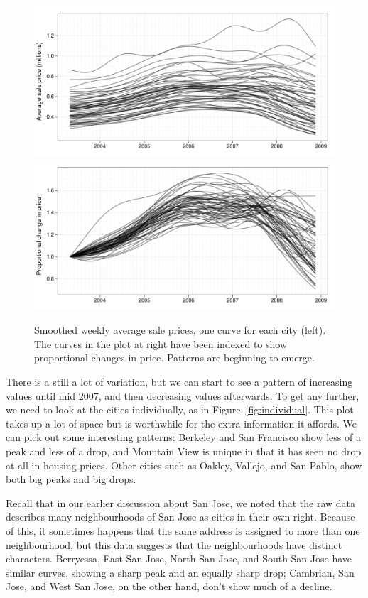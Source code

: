 \documentclass[oneside]{article}
\begin{document}
\begin{figure}[htbp]
  \centering
  \includegraphics[width=0.5 \linewidth]{cities-smooth}%
  \includegraphics[width=0.5 \linewidth]{cities-indexed}
  \caption{Smoothed weekly average sale prices, one curve for each city (left).  The curves in the plot at right have been indexed to show proportional changes in price.  Patterns are beginning to emerge.}
  \label{fig:smoothed}
\end{figure}

There is a still a lot of variation, but we can start to see a pattern of increasing values until mid 2007, and then decreasing values afterwards.  To get any further, we need to look at the cities individually, as in Figure~\ref{fig:individual}.  This plot takes up a lot of space but is worthwhile for the extra information it affords.  We can pick out some interesting patterns: Berkeley and San Francisco show less of a peak and less of a drop, and Mountain View is unique in that it has seen no drop at all in housing prices.  Other cities such as Oakley, Vallejo, and San Pablo, show both big peaks and big drops.

Recall that in our earlier discussion about San Jose, we noted that the raw data describes many neighbourhoods of San Jose as cities in their own right.  Because of this, it sometimes happens that the same address is assigned to more than one neighbourhood, but this data suggests that the neighbourhoods have distinct characters.  Berryessa, East San Jose, North San Jose, and South San Jose have similar curves, showing a sharp peak and an equally sharp drop;  Cambrian, San Jose, and West San Jose, on the other hand, don't show much of a decline.
\end{document}
